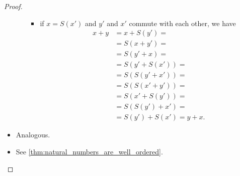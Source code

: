 \begin{proof}
\begin{itemize}
\begin{itemize}
\begin{itemize}
        \item if \( x = S(x') \) and \( y' \) and \( x' \) commute with each other, we have
        \begin{align*}
          x + y
          &=
          x + S(y')
          = \\ &=
          S(x + y')
          = \\ &=
          S(y' + x)
          = \\ &=
          S(y' + S(x'))
          = \\ &=
          S(S(y' + x'))
          = \\ &=
          S(S(x' + y'))
          = \\ &=
          S(x' + S(y'))
          = \\ &=
          S(S(y') + x')
          = \\ &=
          S(y') + S(x')
          =
          y + x.
        \end{align*}
      \end{itemize}
    \end{itemize}

    \item Analogous.

    \item See \cref{thm:natural_numbers_are_well_ordered}.
  \end{itemize}
\end{proof}
